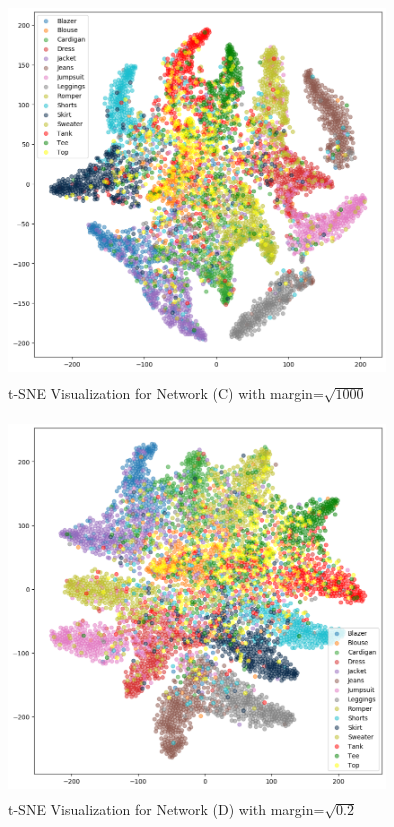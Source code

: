 \documentclass{article}
\begin{document}
\begin{figure}[H]
  \centering
    \includegraphics[width=10cm,height=10cm,keepaspectratio]{tSne_Plots/d_1000_t-sne.png}
    \caption{t-SNE Visualization for Network (C) with margin=$\sqrt{1000}$}
    \label{fig:df}
\end{figure}

\begin{figure}[H]
  \centering
    \includegraphics[width=10cm,height=10cm,keepaspectratio]{tSne_Plots/b_t-sne.png}
    \caption{t-SNE Visualization for Network (D) with margin=$\sqrt{0.2}$\\ \\ \\~}
    \label{fig:df}
\end{figure}
\end{document}
